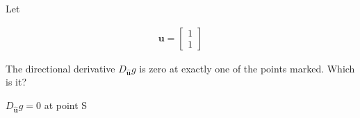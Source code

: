 Let

\begin{align*}
    \boldsymbol{u} = \begin{bmatrix}
        1 \\ 1
    \end{bmatrix}
\end{align*}

The directional derivative $D_{\hat{\boldsymbol{u}}} g$ is zero at exactly one of the points marked. Which is it?

\begin{solution}
    $D_{\hat{\boldsymbol{u}}} g = 0$ at point S
\end{solution}